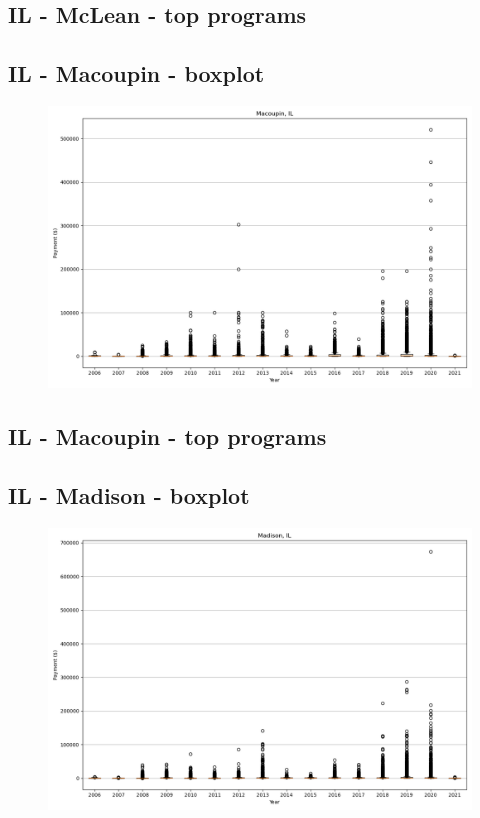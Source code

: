 \subsection*{IL - McLean - top programs}

\newpage
\subsection*{IL - Macoupin - boxplot}
\begin{figure}[h]
\centering
\includegraphics[width=7in]{../output/boxplots/counties/Macoupin-IL_boxplot.png}
\end{figure}


\subsection*{IL - Macoupin - top programs}

\newpage
\subsection*{IL - Madison - boxplot}
\begin{figure}[h]
\centering
\includegraphics[width=7in]{../output/boxplots/counties/Madison-IL_boxplot.png}
\end{figure}


